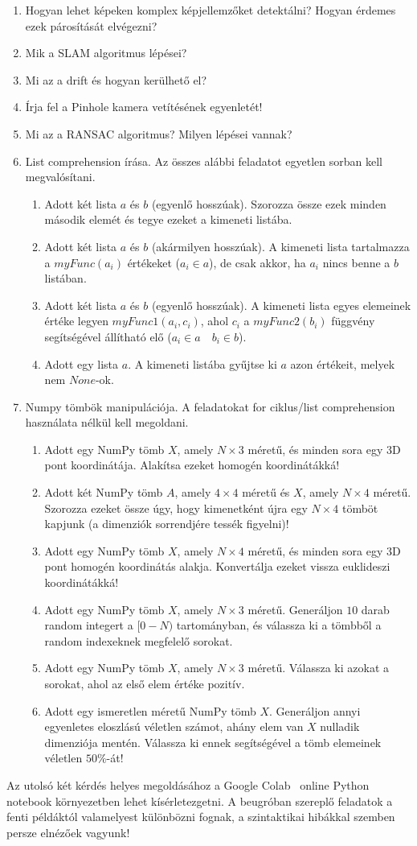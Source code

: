 \documentclass[12pt,a4paper,oneside]{report}             %
\begin{document}
\begin{enumerate}
	\item Hogyan lehet képeken komplex képjellemzőket detektálni? Hogyan érdemes ezek párosítását elvégezni?
	\item Mik a SLAM algoritmus lépései?
	\item Mi az a drift és hogyan kerülhető el?
	\item Írja fel a Pinhole kamera vetítésének egyenletét!
	\item Mi az a RANSAC algoritmus? Milyen lépései vannak?
	\item List comprehension írása. Az összes alábbi feladatot egyetlen sorban kell megvalósítani.
	\begin{enumerate}
		\item Adott két lista $a$ és $b$ (egyenlő hosszúak). Szorozza össze ezek minden második elemét és tegye ezeket a kimeneti listába.
		\item Adott két lista $a$ és $b$ (akármilyen hosszúak). A kimeneti lista tartalmazza a $myFunc(a_i)$ értékeket ($a_i\in a$), de csak akkor, ha $a_i$ nincs benne a $b$ listában.
		\item Adott két lista $a$ és $b$ (egyenlő hosszúak). A kimeneti lista egyes elemeinek értéke legyen $myFunc1(a_i,c_i)$, ahol $c_i$ a $myFunc2(b_i)$ függvény segítségével állítható elő ($a_i\in a$~~$b_i\in b$).
		\item Adott egy lista $a$. A kimeneti listába gyűjtse ki $a$ azon értékeit, melyek nem $None$-ok.
	\end{enumerate}
	\item Numpy tömbök manipulációja. A feladatokat for ciklus/list comprehension használata nélkül kell megoldani.
	\begin{enumerate}
		\item Adott egy NumPy tömb $X$, amely $N\times 3$ méretű, és minden sora egy 3D pont koordinátája. Alakítsa ezeket homogén koordinátákká!
		\item Adott két NumPy tömb $A$, amely $4\times 4$ méretű és $X$, amely $N\times 4$ méretű. Szorozza ezeket össze úgy, hogy kimenetként újra egy $N\times 4$ tömböt kapjunk (a dimenziók sorrendjére tessék figyelni)!
		\item Adott egy NumPy tömb $X$, amely $N\times 4$ méretű, és minden sora egy 3D pont homogén koordinátás alakja. Konvertálja ezeket vissza euklideszi koordinátákká!
		\item Adott egy NumPy tömb $X$, amely $N\times 3$ méretű. Generáljon $10$ darab random integert a $[0-N)$ tartományban, és válassza ki a tömbből a random indexeknek megfelelő sorokat.
		\item Adott egy NumPy tömb $X$, amely $N\times 3$ méretű. Válassza ki azokat a sorokat, ahol az első elem értéke pozitív.
		\item Adott egy ismeretlen méretű NumPy tömb $X$. Generáljon annyi egyenletes eloszlású véletlen számot, ahány elem van $X$ nulladik dimenziója mentén. Válassza ki ennek segítségével a tömb elemeinek véletlen $50\%$-át!
		
	\end{enumerate}
\end{enumerate}

Az utolsó két kérdés helyes megoldásához a Google Colab~\cite{colab} online Python notebook környezetben lehet kísérletezgetni. A beugróban szereplő feladatok a fenti példáktól valamelyest különbözni fognak, a szintaktikai hibákkal szemben persze elnézőek vagyunk!

\printbibliography
\end{document}

